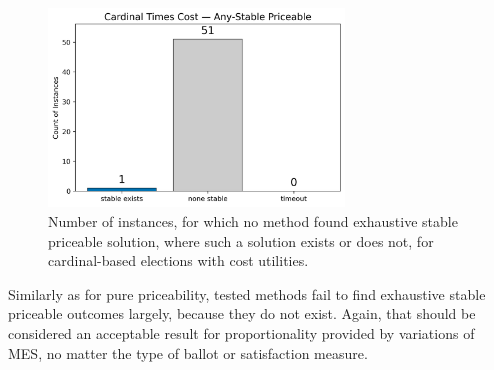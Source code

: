 \begin{figure}[H]         
  \centering              
  \includegraphics[width=0.7\textwidth]{figures/plots/cardinal-times-cost/cardinal_times_cost_any_stable_exhaustive.png}
  \caption{Number of instances, for which no method found exhaustive stable priceable solution, where such a solution exists or does not, for cardinal-based elections with cost utilities.}
  \label{fig:myplot}
\end{figure}
Similarly as for pure priceability, tested methods fail to find exhaustive stable priceable outcomes largely, because they do not exist. Again, that should be considered an acceptable result for proportionality provided by variations of MES, no matter the type of ballot or satisfaction measure.